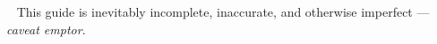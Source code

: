 

\clearpage
\renewcommand\indexname{Subject Index}
\thispagestyle{chapter}
\small
\begin{flushleft}
\printindex
\end{flushleft}
\normalsize

\addtocounter{page}{-1}
\addtocounter{page}{+1}

~
\vfill
\thispagestyle{empty}
This guide is inevitably incomplete, inaccurate, and otherwise imperfect --- \emph{caveat emptor}.

